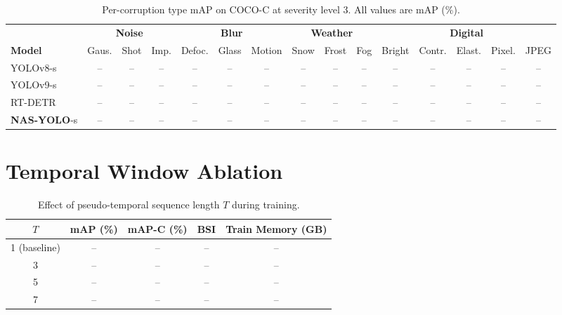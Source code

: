 \documentclass[review]{eccv2026}
\newcommand{\ours}{\textbf{NAS-YOLO}}
\begin{document}
\begin{table}[h]
  \centering
  \caption{Per-corruption type mAP on COCO-C at severity level 3. All values are mAP (\%).}
  \label{tab:supp_corruption_full}
  \small
  \setlength{\tabcolsep}{2pt}
  \begin{tabular}{l|ccc|ccc|ccc|ccccc}
    \toprule
    & \multicolumn{3}{c|}{\textbf{Noise}} & \multicolumn{3}{c|}{\textbf{Blur}} & \multicolumn{3}{c|}{\textbf{Weather}} & \multicolumn{5}{c}{\textbf{Digital}} \\
    \textbf{Model} & Gaus. & Shot & Imp. & Defoc. & Glass & Motion & Snow & Frost & Fog & Bright & Contr. & Elast. & Pixel. & JPEG \\
    \midrule
    YOLOv8-s & -- & -- & -- & -- & -- & -- & -- & -- & -- & -- & -- & -- & -- & -- \\
    YOLOv9-s & -- & -- & -- & -- & -- & -- & -- & -- & -- & -- & -- & -- & -- & -- \\
    RT-DETR & -- & -- & -- & -- & -- & -- & -- & -- & -- & -- & -- & -- & -- & -- \\
    \ours{}-s & -- & -- & -- & -- & -- & -- & -- & -- & -- & -- & -- & -- & -- & -- \\
    \bottomrule
  \end{tabular}
\end{table}

\section{Temporal Window Ablation}
\label{sec:supp_window}

\begin{table}[h]
  \centering
  \caption{Effect of pseudo-temporal sequence length $T$ during training.}
  \label{tab:supp_window}
  \small
  \begin{tabular}{c|ccc|c}
    \toprule
    $T$ & \textbf{mAP} (\%) & \textbf{mAP-C} (\%) & \textbf{BSI} & \textbf{Train Memory (GB)} \\
    \midrule
    1 (baseline) & -- & -- & -- & -- \\
    3 & -- & -- & -- & -- \\
    5 & -- & -- & -- & -- \\
    7 & -- & -- & -- & -- \\
    \bottomrule
  \end{tabular}
\end{table}

\end{document}
